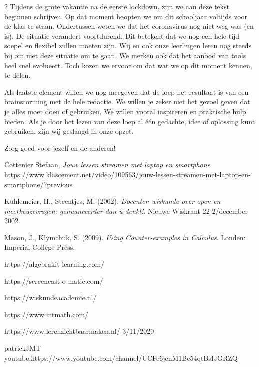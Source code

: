 \begin{multicols} {2}
Tijdens de grote vakantie na de eerste lockdown, zijn we aan deze tekst beginnen schrijven. Op dat moment hoopten we om dit schooljaar voltijds voor de klas te staan. Ondertussen weten we dat het coronavirus nog niet weg was (en is). De situatie verandert voortdurend. Dit betekent dat we nog een hele tijd soepel en flexibel zullen moeten zijn. Wij en ook onze leerlingen leren nog steeds bij om met deze situatie om te gaan. We merken ook dat het aanbod van tools heel snel evolueert. Toch kozen we ervoor om dat wat we op dit moment kennen, te delen.

Als laatste element willen we nog meegeven dat de loep het resultaat is van een brainstorming met de hele redactie. We willen je zeker niet het gevoel geven dat je alles moet doen of gebruiken. We willen vooral inspireren en praktische hulp bieden. Als je door het lezen van deze loep al één gedachte, idee of oplossing kunt gebruiken, zijn wij geslaagd in onze opzet.

Zorg goed voor jezelf en de anderen! 

\end{multicols}
\vspace{1 cm}
\begin{bronnen}
\item Cottenier Stefaan, \emph{Jouw lessen streamen met laptop en smartphone}
https://www.klascement.net/video/109563/jouw-lessen-streamen-met-laptop-en-smartphone/?previous
\item Kuhlemeier, H., Steentjes, M. (2002). \emph{Docenten wiskunde over open en meerkeuzevragen:
genuanceerder dan u denkt!}. Nieuwe Wiskrant 22-2/december 2002
\item Mason, J., Klymchuk, S. (2009). \emph{Using Counter-examples in Calculus}. Londen: Imperial College Press.
\item https://algebrakit-learning.com/
\item https://screencast-o-matic.com/
\item https://wiskundeacademie.nl/
\item https://www.intmath.com/
\item https://www.lerenzichtbaarmaken.nl/ 3/11/2020
\item patrickJMT youtube:https://www.youtube.com/channel/UCFe6jenM1Bc54qtBsIJGRZQ

\end{bronnen}

